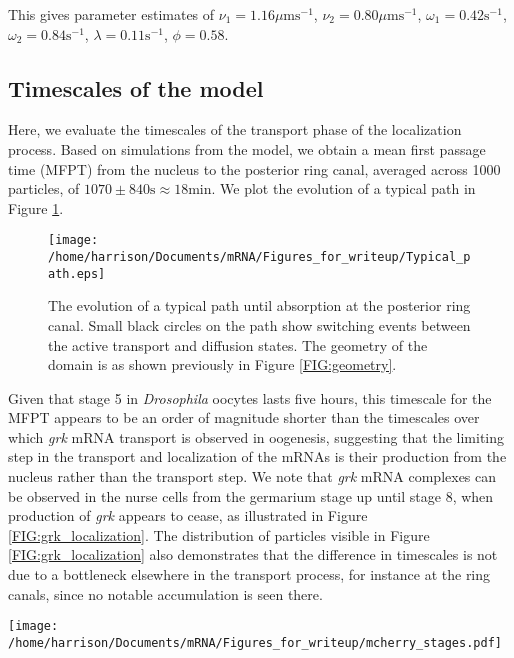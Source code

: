\documentclass[twocolumn]{biophys}
\begin{document}
This gives parameter estimates of $\nu_1 = 1.16  \mu \text{ms}^{-1}$, $\nu_2 = 0.80  \mu \text{ms}^{-1}$, $\omega_1 = 0.42 \text{s}^{-1} $, $\omega_2 = 0.84 \text{s}^{-1}$, $\lambda = 0.11 \text{s}^{-1}$, $\phi = 0.58$.

\subsection{Timescales of the model}
Here, we evaluate the timescales of the transport phase of the localization process.
Based on simulations from the model, we obtain a mean first passage time (MFPT) from the nucleus to the posterior ring canal, averaged across 1000 particles, of $1070 \pm 840 \text{s} \approx 18 \text{min}$.
We plot the evolution of a typical path in Figure \ref{FIG:Typical_path}.
\begin{figure}[h]
 \centering
 \texttt{[image: /home/harrison/Documents/mRNA/Figures\_for\_writeup/Typical\_path.eps]}
 \caption{\small The evolution of a typical path until absorption at the posterior ring canal. 
 Small black circles on the path show switching events between the active transport and diffusion states. 
 The geometry of the domain is as shown previously in Figure \ref{FIG:geometry}.}
 \label{FIG:Typical_path}
\end{figure}
Given that stage 5 in \textit{Drosophila} oocytes lasts five hours, this timescale for the MFPT appears to be an order of magnitude shorter than the timescales over which \textit{grk} mRNA transport is observed in oogenesis, suggesting that the limiting step in the transport and localization of the mRNAs is their production from the nucleus rather than the transport step.
We note that \textit{grk} mRNA complexes can be observed in the nurse cells from the germarium stage up until stage 8, when production of \textit{grk} appears to cease, as illustrated in Figure \ref{FIG:grk_localization}.
The distribution of particles visible in Figure \ref{FIG:grk_localization} also demonstrates that the difference in timescales is not due to a bottleneck elsewhere in the transport process, for instance at the ring canals, since no notable accumulation is seen there.
\begin{figure*}
 \centering
 \texttt{[image: /home/harrison/Documents/mRNA/Figures\_for\_writeup/mcherry\_stages.pdf]}
 \caption{\small Localization of \textit{grk} mRNA at different stages of \textit{Drosophila} oogenesis. Increasing accumulation is seen in the oocyte over time. RNP particles can be seen in the nurse cell, until stage 8. The \textit{grk} mRNA was tagged with mcherry for visualization.}
 \label{FIG:grk_localization}
\end{figure*}
\end{document}
